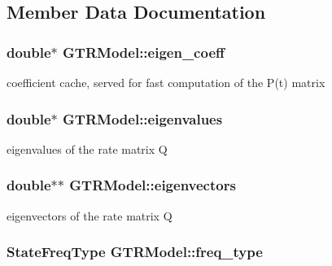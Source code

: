 \subsection{Member Data Documentation}
\hypertarget{classGTRModel_a79645d7740f239a3a101c0b58fcb236c}{
\subsubsection[{eigen\_\-coeff}]{\setlength{\rightskip}{0pt plus 5cm}double$\ast$ {\bf GTRModel::eigen\_\-coeff}}}
\label{classGTRModel_a79645d7740f239a3a101c0b58fcb236c}
coefficient cache, served for fast computation of the P(t) matrix \hypertarget{classGTRModel_a162f4d6889a320c2753ea31d6c0b03f1}{
\subsubsection[{eigenvalues}]{\setlength{\rightskip}{0pt plus 5cm}double$\ast$ {\bf GTRModel::eigenvalues}}}
\label{classGTRModel_a162f4d6889a320c2753ea31d6c0b03f1}
eigenvalues of the rate matrix Q \hypertarget{classGTRModel_ab8e201929a6d84d9bd2e58d0a3e03b5b}{
\subsubsection[{eigenvectors}]{\setlength{\rightskip}{0pt plus 5cm}double$\ast$$\ast$ {\bf GTRModel::eigenvectors}}}
\label{classGTRModel_ab8e201929a6d84d9bd2e58d0a3e03b5b}
eigenvectors of the rate matrix Q \hypertarget{classGTRModel_a699318690979ff66c655dd3022d5127a}{
\subsubsection[{freq\_\-type}]{\setlength{\rightskip}{0pt plus 5cm}StateFreqType {\bf GTRModel::freq\_\-type}}}
